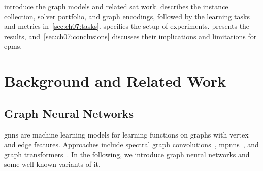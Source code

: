  introduce the graph models and related \gls{sat} work.  describes the instance collection, solver portfolio, and graph encodings, followed by the learning tasks and metrics in~\cref{sec:ch07:tasks}.  specifies the setup of experiments.  presents the results, and~\cref{sec:ch07:conclusions} discusses their implications and limitations for \glspl{epm}.

\section{Background and Related Work}
\subsection{Graph Neural Networks}
\label{sec:ch07:gnn-background}
\Glspl{gnn} are machine learning models for learning functions on graphs with vertex and edge features. Approaches include spectral graph convolutions~\citep{BruEtAl14}, \glspl{mpnn}~\citep{GilEtAl17}, and graph transformers~\citep{MulEtAl24,StoEtAl25}. In the following, we introduce graph neural networks and some well-known variants of it.

